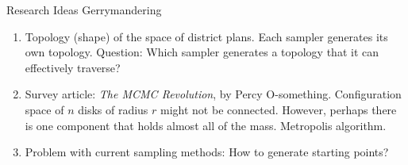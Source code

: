 \documentclass[12pt]{article}
\theoremstyle{plain}
\theoremstyle{definition}
\begin{document}
\begin{center}
{\large Research Ideas} \linebreak Gerrymandering
\end{center}

\begin{enumerate}
\item Topology (shape) of the space of district plans.  Each sampler generates its own topology.  Question: Which sampler generates a topology that it can effectively traverse?
\item Survey article: \emph{The MCMC Revolution}, by Percy O-something. Configuration space of $n$ disks of radius $r$ might not be connected.  However, perhaps there is one component that holds almost all of the mass. Metropolis algorithm.
\item Problem with current sampling methods: How to generate starting points?
\end{enumerate}
\end{document}
